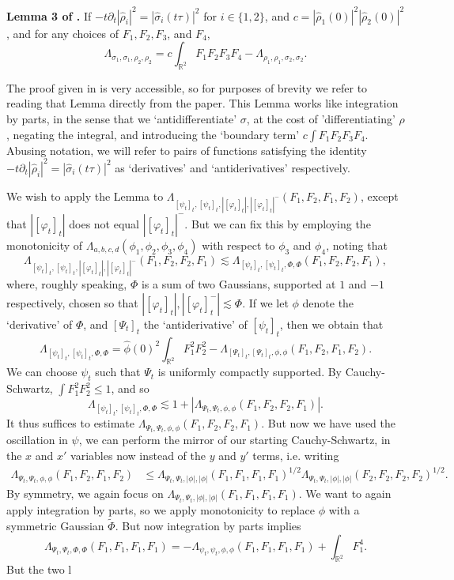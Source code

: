 \documentclass[12pt]{article}
\newcommand*{\R}{\mathbb{R}}
\begin{document}
\vspace{0.8em}

\noindent \textbf{Lemma 3 of \cite{dujdjf}.}
    If $-t\partial_t|\widehat{\rho}_i|^2 = |\widehat{\sigma}_i(t \tau)|^2$ for $i \in \{ 1, 2 \}$, and $c = |\widehat{\rho}_1(0)|^2 |\widehat{\rho}_2(0)|^2$, and for any choices of $F_1,F_2,F_3$, and $F_4$,
    \[ \Lambda_{\sigma_1,\sigma_1,\rho_2,\rho_2} = c \int_{\R^2} F_1 F_2 F_3 F_4 - \Lambda_{\rho_1, \rho_1, \sigma_2, \sigma_2}. \]

The proof given in \cite{dujdjf} is very accessible, so for purposes of brevity we refer to reading that Lemma directly from the paper. This Lemma works like integration by parts, in the sense that we `antidifferentiate' $\sigma$, at the cost of 'differentiating' $\rho$, negating the integral, and introducing the `boundary term' $c \int F_1F_2F_3F_4$. Abusing notation, we will refer to pairs of functions satisfying the identity $- t \partial_t |\widehat{\rho}_i|^2 = |\widehat{\sigma}_i(t \tau)|^2$ as `derivatives' and `antiderivatives' respectively.

We wish to apply the Lemma to $\Lambda_{[\psi_t]_t, [\psi_t]_t, |[\varphi_t]_t|, |[\varphi_t]_t|^-}(F_1,F_2,F_1,F_2)$, except that $|[\varphi_t]_t|$ does not equal $|[\varphi_t]_t|^-$. But we can fix this by employing the monotonicity of $\Lambda_{a,b,c,d}(\phi_1,\phi_2,\phi_3,\phi_4)$ with respect to $\phi_3$ and $\phi_4$, noting that
%
\[ \Lambda_{[\psi_t]_t, [\psi_t]_t, |[\varphi_t]_t|, |[\varphi_t]_t|^-}(F_1,F_2,F_2,F_1) \lesssim \Lambda_{[\psi_t]_t, [\psi_t]_t, \Phi, \Phi}(F_1,F_2,F_2,F_1), \]
%
where, roughly speaking, $\Phi$ is a sum of two Gaussians, supported at $1$ and $-1$ respectively, chosen so that $|[\varphi_t]_t|, |[\varphi_t]_t^-| \lesssim \Phi$. If we let $\phi$ denote the `derivative' of $\Phi$, and $[\Psi_t]_t$ the `antiderivative' of $[\psi_t]_t$, then we obtain that
%
\[ \Lambda_{[\psi_t]_t, [\psi_t]_t, \Phi, \Phi} = \widehat{\phi}(0)^2 \int_{\R^2} F_1^2 F_2^2 - \Lambda_{[\Psi_t]_t, [\Psi_t]_t, \phi, \phi}(F_1,F_2,F_1,F_2). \]
%
We can choose $\psi_t$ such that $\Psi_t$ is uniformly compactly supported. By Cauchy-Schwartz, $\int F_1^2 F_2^2 \leq 1$, and so
%
\[ \Lambda_{[\psi_t]_t, [\psi_t]_t, \Phi, \Phi} \lesssim 1 + |\Lambda_{\Psi_t, \Psi_t, \phi, \phi}(F_1,F_2,F_2,F_1)|. \]
%
It thus suffices to estimate $\Lambda_{\Psi_t, \Psi_t, \phi, \phi}(F_1,F_2,F_2,F_1)$. But now we have used the oscillation in $\psi$, we can perform the mirror of our starting Cauchy-Schwartz, in the $x$ and $x'$ variables now instead of the $y$ and $y'$ terms, i.e. writing
%
\begin{align*}
    \Lambda_{\Psi_t, \Psi_t, \phi, \phi}(F_1,F_2,F_1,F_2) &\leq \Lambda_{\Psi_t,\Psi_t,|\phi|,|\phi|}(F_1,F_1,F_1,F_1)^{1/2} \Lambda_{\Psi_t, \Psi_t, |\phi|, |\phi|}(F_2,F_2,F_2,F_2)^{1/2}.
\end{align*}
%
By symmetry, we again focus on $\Lambda_{\Psi_t,\Psi_t,|\phi|,|\phi|}(F_1,F_1,F_1,F_1)$. We want to again apply integration by parts, so we apply monotonicity to replace $\phi$ with a symmetric Gaussian $\tilde{\Phi}$. But now integration by parts implies
%
\[ \Lambda_{\Psi_t,\Psi_t,\Phi, \Phi}(F_1,F_1,F_1,F_1) = - \Lambda_{\psi_t,\psi_t,\phi,\phi}(F_1,F_1,F_1,F_1) + \int_{\R^2} F_1^4. \]
%
But the two l
\end{document}
